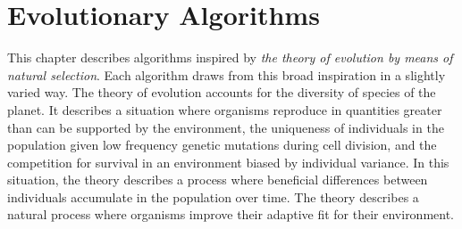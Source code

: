 \chapter{Evolutionary Algorithms}
\label{ch:evolution}

This chapter describes algorithms inspired by \emph{the theory of evolution by means of natural selection}. Each algorithm draws from this broad inspiration in a slightly varied way. The theory of evolution accounts for the diversity of species of the planet. It describes a situation where organisms reproduce in quantities greater than can be supported by the environment, the uniqueness of individuals in the population given low frequency genetic mutations during cell division, and the competition for survival in an environment biased by individual variance. In this situation, the theory describes a process where beneficial differences between individuals accumulate in the population over time. The theory describes a natural process where organisms improve their adaptive fit for their environment.








